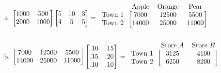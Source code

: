 \documentclass[letterpaper,fleqn]{article}
\begin{document}
\begin{enumerate}
\begin{enumerate}
\begin{enumerate}[(a)]
				\item
				$\begin{bmatrix*}
					1000 & 500 \\
					2000 & 1000 \\
				\end{bmatrix*}
				\begin{bmatrix*}
					5 & 10 & 3 \\
					4 & 5 & 5 \\
				\end{bmatrix*}
				=
				\begin{blockarray}{cccc}
					& \text{Apple} & \text{Orange} & \text{Pear} \\
					\begin{block}{c[ccc]}
						\text{Town 1} & 7000 & 12500 & 5500 \\
						\text{Town 2} & 14000 & 25000 & 11000 \\
					\end{block}
				\end{blockarray}$
				
				\item
				$\begin{bmatrix*}
					7000 & 12500 & 5500 \\
					14000 & 25000 & 11000 \\
				\end{bmatrix*}
				\begin{bmatrix*}
					.10 & .15 \\
					.15 & .20 \\
					.10 & .10 \\
				\end{bmatrix*}
				=
				\begin{blockarray}{ccc}
					& \text{Store $A$} & \text{Store $B$} \\
					\begin{block}{c[cc]}
						\text{Town 1} & 3125 & 4100 \\
						\text{Town 2} & 6250 & 8200 \\
					\end{block}
				\end{blockarray}$
			\end{enumerate}
		\end{enumerate}
		

\end{enumerate}
\end{document}
